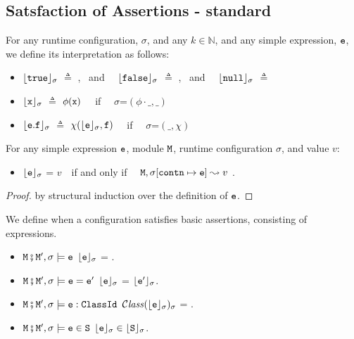 \subsection{Satsfaction of Assertions - standard}


 \begin{definition}

For any runtime configuration, $\sigma$, and any $k\in \mathbb{N}$, and any simple expression, $\SE$, we define its interpretation as follows:

\begin{itemize}
     \item
  $\interp {\prg{true}}{\sigma}$ $ \triangleq$   , \ and \ \    $\interp {\prg{false}}{\sigma}$ $ \triangleq$ , \ and \ \
   $\interp {}{\sigma}$ $ \triangleq$  \prg{null}
  \item
  $\interp {\x}{\sigma}$ $ \triangleq$ $\phi(\x)$  \ \ if \ \ $\sigma$=$(\phi\cdot\_,\_)$
  \item
  $\interp {\SE.\prg{f}}{\sigma}$ $ \triangleq$ $\chi({\interp {\SE}{\sigma}}, \prg{f})$  \ \ if \ \ $\sigma$=$(\_,\chi)$
   \end{itemize}
\end{definition}

\begin{lemma}
For any simple expression $\SE$, module $\M$,  runtime configuration $\sigma$, and value $v$:
\begin{itemize}
  \item
   $\interp \SE {\sigma}$ = $v$\ \     if and only if \ \ $\M, \sigma[\prg{contn}\mapsto \SE] \leadsto v$ .
\end{itemize}
\end{lemma}
\begin{proof} by structural induction  over the definition of $\SE$.\end{proof}
   

\begin{definition}[ Basic Assertions] We define   when a configuration satisfies basic assertions, consisting of %
expressions.
 \label{def:valid:assertion:basic}
\begin{itemize}
\item
$\M\mkpair \M', \sigma \models\SE$ \IFF  $\interp{\SE}{\sigma}$ = .
\item
$\M\mkpair \M', \sigma \models\SE=\SEPrime$ \IFF $\interp{\SE}{\sigma}$ = $\interp{\SEPrime}{\sigma}$.
\item
$\M\mkpair \M', \sigma \models\SE:\prg{ClassId}$ \IFF $\ClassOf{\interp{\SE}{\sigma}}{\sigma}$ = .
\item
$\M\mkpair \M', \sigma \models \SE\in \prg{S}$ \IFF $\interp{\SE}{\sigma}\in \interp{\prg{S}}{\sigma}$.
\end{itemize}
\end{definition}

